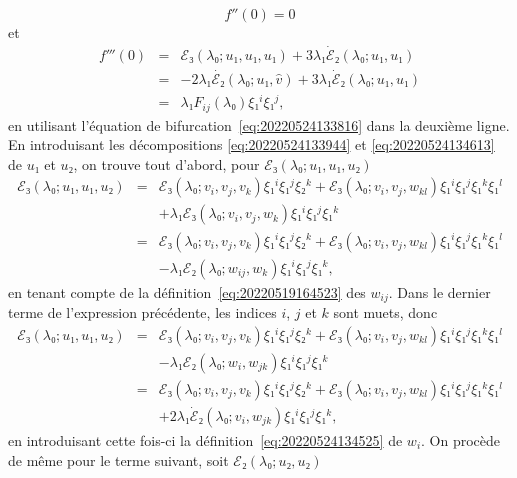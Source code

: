 \documentclass[12pt, final]{amsart}
\theoremstyle{definition}
\begin{document}
\begin{equation}
 \label{eq:DL energie derivee 2nde} f''(0) = 0
\end{equation}
et
\begin{eqnarray}
 f'''(0) & = & ℰ₃(λ₀ ; u₁, u₁, u₁) + 3 λ₁
 \dot{ℰ}₂(λ₀ ; u₁, u₁) \nonumber\\
 & = & - 2 λ₁ \dot{ℰ₂}(λ₀ ; u₁, \hat{v}) + 3
 λ₁ \dot{ℰ}₂(λ₀ ; u₁, u₁) \nonumber\\
 & = & λ₁ F_{i j}(λ₀) ξ₁^i ξ₁^j, \label{eq:DL
 energie derivee 3ieme}
\end{eqnarray}
en utilisant l'équation de bifurcation~\eqref{eq:20220524133816} dans la deuxième ligne. En introduisant les décompositions \eqref{eq:20220524133944} et \eqref{eq:20220524134613} de \(u₁\) et \(u₂\), on trouve tout d'abord, pour \(ℰ₃(λ₀ ; u₁, u₁, u₂)\)
\begin{eqnarray*}
 ℰ₃(λ₀ ; u₁, u₁, u₂) & = & ℰ₃(λ₀ ;
 v_i, v_j, v_k) ξ₁^i ξ₁^j ξ₂^k +ℰ₃(λ₀ ; v_i, v_j,
 w_{k l}) ξ₁^i ξ₁^j ξ₁^k ξ₁^l\\
 & & + λ₁ ℰ₃(λ₀ ; v_i, v_j, w_k)
 ξ₁^i ξ₁^j ξ₁^k\\
 & = & ℰ₃(λ₀ ; v_i, v_j, v_k) ξ₁^i ξ₁^j ξ₂^k
 +ℰ₃(λ₀ ; v_i, v_j, w_{k l}) ξ₁^i ξ₁^j
 ξ₁^k ξ₁^l\\
 & & - λ₁ ℰ₂(λ₀ ; w_{i j},
 w_k) ξ₁^i ξ₁^j ξ₁^k,
\end{eqnarray*}
en tenant compte de la définition~\eqref{eq:20220519164523} des \(w_{i j}\). Dans le dernier terme de l'expression précédente, les indices \(i\), \(j\) et \(k\) sont muets, donc
\begin{eqnarray*}
 ℰ₃(λ₀ ; u₁, u₁, u₂) & = & ℰ₃(λ₀ ;
 v_i, v_j, v_k) ξ₁^i ξ₁^j ξ₂^k +ℰ₃(λ₀ ; v_i, v_j,
 w_{k l}) ξ₁^i ξ₁^j ξ₁^k ξ₁^l\\
 & & - λ₁ ℰ₂(λ₀ ; w_{i }, w_{j
  k}) ξ₁^i ξ₁^j ξ₁^k\\
 & = & ℰ₃(λ₀ ; v_i, v_j, v_k) ξ₁^i ξ₁^j ξ₂^k
 +ℰ₃(λ₀ ; v_i, v_j, w_{k l}) ξ₁^i ξ₁^j
 ξ₁^k ξ₁^l\\
 & & + 2 λ₁ \dot{ℰ}₂(λ₀ ; v_{i
 }, w_{j k}) ξ₁^i ξ₁^j ξ₁^k,
\end{eqnarray*}
en introduisant cette fois-ci la définition~\eqref{eq:20220524134525} de \(w_i .\) On procède de même pour le terme suivant, soit \(ℰ₂(λ₀ ; u₂, u₂)\)
\end{document}
